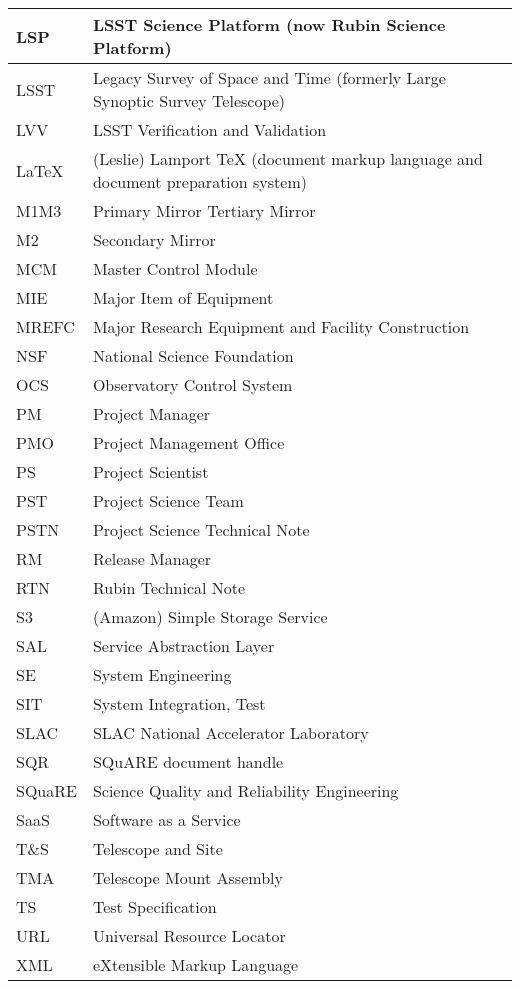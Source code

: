 \begin{longtable}{p{}p{}}
LSP & LSST Science Platform (now Rubin Science Platform) \\\hline
LSST & Legacy Survey of Space and Time (formerly Large Synoptic Survey Telescope) \\\hline
LVV & LSST Verification and Validation \\\hline
LaTeX & (Leslie) Lamport TeX (document markup language and document preparation system) \\\hline
M1M3 & Primary Mirror Tertiary Mirror \\\hline
M2 & Secondary Mirror \\\hline
MCM & Master Control Module \\\hline
MIE & Major Item of Equipment \\\hline
MREFC & Major Research Equipment and Facility Construction \\\hline
NSF & National Science Foundation \\\hline
OCS & Observatory Control System \\\hline
PM & Project Manager \\\hline
PMO & Project Management Office \\\hline
PS & Project Scientist \\\hline
PST & Project Science Team \\\hline
PSTN & Project Science Technical Note \\\hline
RM & Release Manager \\\hline
RTN & Rubin Technical Note \\\hline
S3 & (Amazon) Simple Storage Service  \\\hline
SAL & Service Abstraction Layer \\\hline
SE & System Engineering \\\hline
SIT & System Integration, Test \\\hline
SLAC & SLAC National Accelerator Laboratory \\\hline
SQR & SQuARE document handle \\\hline
SQuaRE & Science Quality and Reliability Engineering \\\hline
SaaS & Software as a Service \\\hline
T\&S & Telescope and Site \\\hline
TMA & Telescope Mount Assembly \\\hline
TS & Test Specification \\\hline
URL & Universal Resource Locator \\\hline
XML & eXtensible Markup Language \\\hline
\end{longtable}
